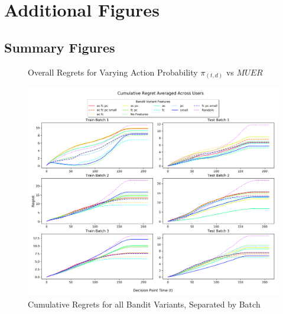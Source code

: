 \chapter{Additional Figures}
\label{AppendixA}

\section{Summary Figures}

\begin{figure}[h!]
\caption{Overall Regrets for Varying Action Probability $\pi_{(t,d)}$ vs $MUER$}
\label{RandomActionVsProbability}
\end{figure}


\begin{figure}[H]
\includegraphics[width=1.35\textwidth,center]{figures/cum_regret_comparison.png}%
\caption{Cumulative Regrets for all Bandit Variants, Separated by Batch}
\label{Cumulative Regrets for all Bandit Variants, Separated by Batch}
\end{figure}

